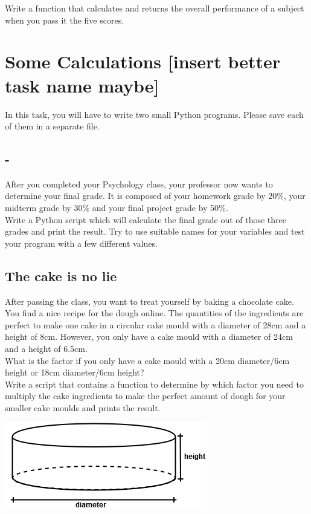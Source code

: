 \documentclass{article}
\begin{document}
Write a function that calculates and returns the overall performance of a subject when you pass it the five scores.

\section{Some Calculations [insert better task name maybe]}
In this task, you will have to write two small Python programs. Please save each
of them in a separate file.

\subsection{-}
After you completed your Psychology class, your professor now wants to determine your final grade.
It is composed of your homework grade by 20\%, your midterm grade by 30\% and your final
project grade by 50\%.\\
Write a Python script which will calculate the final grade out of those three grades
and print the result. Try to use suitable names for your variables and test your program with
a few different values.

\subsection{The cake is no lie}
After passing the class, you want to treat yourself by baking
a chocolate cake. You find a nice recipe for the dough online. The quantities of
the ingredients are perfect to make one cake in a circular cake mould with a diameter
of 28cm and a height of 8cm. However, you only have a cake mould with a diameter of 24cm and a height of 6.5cm.\\
What is the factor if you only have a cake mould with a 20cm diameter/6cm height or 18cm diameter/6cm height?\\
Write a script that contains a function to determine by which factor you need to multiply the cake ingredients to make the perfect amount of dough for your smaller cake moulds and prints the result.\\

\begin{center}
\includegraphics[scale=0.6]{Ex_2_Cake}
\end{center}
\end{document}
